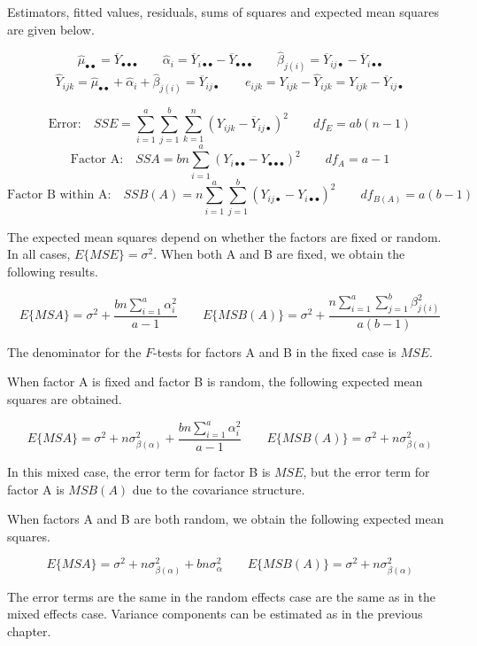 \documentclass[
]{book}
\begin{document}
Estimators, fitted values, residuals, sums of squares and expected mean
squares are given below.

\[
\hat{\mu}_{\bullet\bullet}=\overline{Y}_{\bullet\bullet\bullet}
\qquad \hat{\alpha}_i=
\overline{Y}_{i\bullet\bullet}-\overline{Y}_{\bullet\bullet\bullet}
\qquad \hat{\beta}_{j(i)}
=\overline{Y}_{ij\bullet}-\overline{Y}_{i\bullet\bullet}
\] \[
\hat{Y}_{ijk}=\hat{\mu}_{\bullet\bullet}+\hat{\alpha}_i+\hat{\beta}_{j(i)}
=\overline{Y}_{ij\bullet} \qquad
e_{ijk}=Y_{ijk}-\hat{Y}_{ijk}=Y_{ijk}-\overline{Y}_{ij\bullet}
\]

\[
\mbox{Error:} \quad SSE = \sum_{i=1}^a\sum_{j=1}^b\sum_{k=1}^n
\left(Y_{ijk}-\overline{Y}_{ij\bullet}\right)^2
\qquad  df_E=ab(n-1)
\] \[
\mbox{Factor A:} \quad SSA =bn\sum_{i=1}^a
\left(Y_{i\bullet\bullet}-Y_{\bullet\bullet\bullet}\right)^2
\qquad df_A =a-1
\] \[
\mbox{Factor B within A:} \quad SSB(A) =n\sum_{i=1}^a\sum_{j=1}^b
\left(Y_{ij\bullet}-Y_{i\bullet\bullet}\right)^2
\qquad df_{B(A)} =a(b-1)
\]

The expected mean squares depend on whether the factors are fixed or
random. In all cases, \(E\{MSE\}=\sigma^2\). When both A and B are
fixed, we obtain the following results.

\[
E\{MSA\}=\sigma^2 + \frac{bn\sum_{i=1}^a\alpha_i^2}{a-1}
\qquad
E\{MSB(A)\} = \sigma^2 + 
\frac{n\sum_{i=1}^a\sum_{j=1}^b \beta_{j(i)}^2}{a(b-1)}
\]

The denominator for the \(F\)-tests for factors A and B in the fixed
case is \(MSE\).

When factor A is fixed and factor B is random, the following expected
mean squares are obtained.

\[
E\{MSA\}=\sigma^2 + n\sigma_{\beta(\alpha)}^2 + \frac{bn\sum_{i=1}^a\alpha_i^2}{a-1}
\qquad
E\{MSB(A)\} = \sigma^2 + 
n\sigma_{\beta(\alpha)}^2
\]

In this mixed case, the error term for factor B is \(MSE\), but the
error term for factor A is \(MSB(A)\) due to the covariance structure.

When factors A and B are both random, we obtain the following expected
mean squares.

\[
E\{MSA\}=\sigma^2 + n\sigma_{\beta(\alpha)}^2 + bn\sigma_{\alpha}^2
\qquad
E\{MSB(A)\} = \sigma^2 + 
n\sigma_{\beta(\alpha)}^2
\]

The error terms are the same in the random effects case are the same as
in the mixed effects case. Variance components can be estimated as in
the previous chapter.
\end{document}
